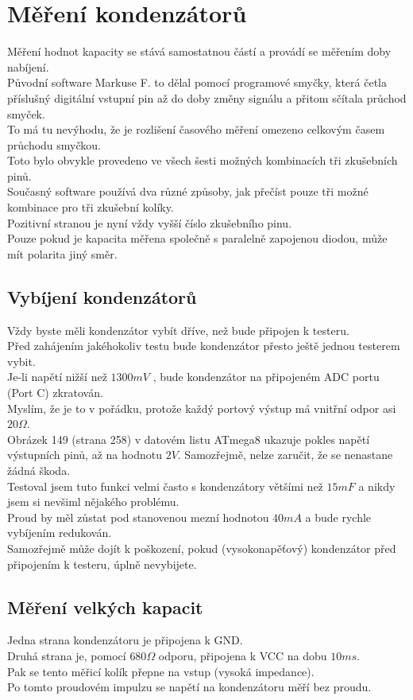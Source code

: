 \section{Měření kondenzátorů}
Měření hodnot kapacity se stává samostatnou částí a provádí se měřením doby nabíjení.\\
Původní software Markuse F. to dělal pomocí programové smyčky, která četla příslušný digitální
vstupní pin až do doby změny signálu a přitom sčítala průchod smyček.\\
To má tu nevýhodu, že je rozlišení časového měření omezeno celkovým časem průchodu smyčkou.\\
Toto bylo obvykle provedeno ve všech šesti možných kombinacích tři zkušebních pinů.\\
Současný software používá dva různé způsoby, jak přečíst pouze tři
možné kombinace pro tři zkušební kolíky.\\
Pozitivní stranou je nyní vždy vyšší číslo zkušebního pinu.\\
Pouze pokud je kapacita měřena společně s paralelně zapojenou diodou,
může mít polarita jiný směr.

\subsection{Vybíjení kondenzátorů}
Vždy byste měli kondenzátor vybít dříve, než bude připojen k testeru.\\
Před zahájením jakéhokoliv testu bude kondenzátor přesto ještě jednou testerem vybit.\\
Je-li napětí nižší než \(1300mV\) ,  bude kondenzátor na připojeném ADC portu (Port C) zkratován.\\
Myslím, že je to v pořádku, protože každý portový výstup má vnitřní odpor asi \(20\Omega\).\\
Obrázek 149 (strana 258) v datovém listu ATmega8 \cite{ATmega8} ukazuje pokles napětí výstupních pinů, až na hodnotu \(2V\). Samozřejmě, nelze zaručit, že se nenastane žádná škoda.\\
Testoval jsem tuto funkci velmi často s kondenzátory většími než \(15mF\)  a nikdy jsem si nevšiml nějakého problému.\\
Proud by měl zůstat pod stanovenou mezní hodnotou \(40mA\) a bude rychle vybíjením redukován.\\
Samozřejmě může dojít k poškození, pokud (vysokonapěťový) kondenzátor před připojením k testeru, úplně nevybijete.
\subsection{Měření velkých kapacit}
\label{sec:bigcap}
Jedna strana kondenzátoru je připojena k GND.\\
Druhá strana je, pomocí \(680\Omega\) odporu, připojena k VCC na dobu \(10ms\).\\
Pak se tento měřicí kolík přepne na vstup (vysoká impedance).\\
Po tomto proudovém impulzu se napětí na kondenzátoru měří bez proudu.

